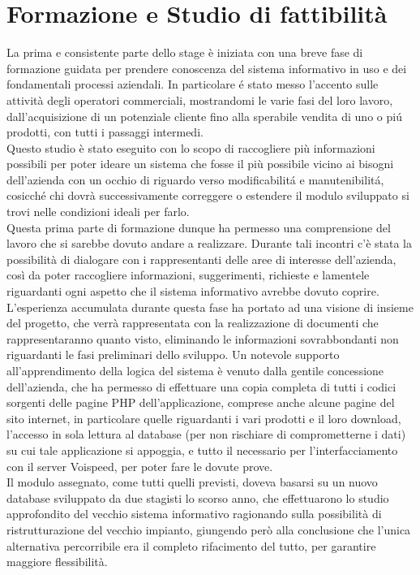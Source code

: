 \section{Formazione e Studio di fattibilit\` a}
La prima e consistente parte dello stage \`e iniziata con una breve fase di formazione guidata per prendere conoscenza del sistema informativo in uso e dei fondamentali processi aziendali. In particolare \'e stato messo l'accento sulle attivit\`a degli operatori commerciali, mostrandomi le varie fasi del loro lavoro, dall'acquisizione di un potenziale cliente fino alla sperabile vendita di uno o pi\'u prodotti, con tutti i passaggi intermedi. \\
Questo studio \`e stato eseguito con lo scopo di raccogliere pi\`u informazioni possibili per poter ideare un sistema che fosse il pi\`u possibile vicino ai bisogni dell'azienda con un occhio di riguardo verso modificabilit\'a e manutenibilit\'a, cosicch\'e chi dovr\`a successivamente correggere o estendere il modulo sviluppato si trovi nelle condizioni ideali per farlo. \\
Questa prima parte di formazione dunque ha permesso una comprensione del lavoro che si sarebbe dovuto andare a realizzare. Durante tali incontri c'\`e stata la possibilit\`a di dialogare con i rappresentanti delle aree di interesse dell'azienda, cos\`i da poter raccogliere informazioni, suggerimenti, richieste e lamentele riguardanti ogni aspetto che il sistema informativo avrebbe dovuto coprire. \\
L'esperienza accumulata durante questa fase ha portato ad una visione di insieme del progetto, che verr\`a rappresentata con la realizzazione di documenti che rappresentaranno quanto visto, eliminando le informazioni sovrabbondanti non riguardanti le fasi preliminari dello sviluppo. Un notevole supporto all'apprendimento della logica del sistema \`e venuto dalla gentile concessione dell'azienda, che ha permesso di effettuare una copia completa di tutti i codici sorgenti delle pagine PHP dell'applicazione, comprese anche alcune pagine del sito internet, in particolare quelle riguardanti i vari prodotti e il loro download, l'accesso in sola lettura al database (per non rischiare di comprometterne i dati) su cui tale applicazione si appoggia, e tutto il necessario per l'interfacciamento con il server Voispeed, per poter fare le dovute prove. \\
Il modulo assegnato, come tutti quelli previsti, doveva basarsi su un nuovo database sviluppato da due stagisti lo scorso anno, che effettuarono lo studio approfondito del vecchio sistema informativo ragionando sulla possibilit\`a di ristrutturazione del vecchio impianto, giungendo per\`o alla conclusione che l'unica alternativa percorribile era il completo rifacimento del tutto, per garantire maggiore flessibilit\`a. \\
